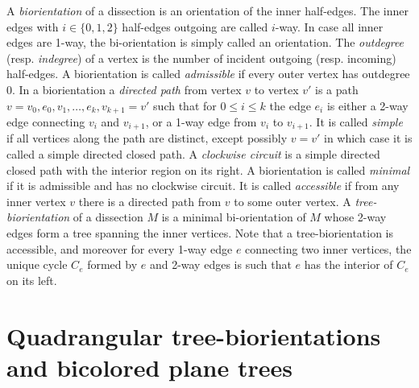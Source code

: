 \documentclass[letter]{amsart}
\numberwithin{theo}{section}
\theoremstyle{remark}
\begin{document}
A \emph{biorientation} of a dissection is an orientation of the inner half-edges. The inner edges with $i\in\{0,1,2\}$ half-edges outgoing are called $i$-way. In case all inner edges are 1-way, the bi-orientation is simply called an orientation. The \emph{outdegree} (resp. \emph{indegree}) of a vertex is the number of incident outgoing (resp. incoming) half-edges. 
A biorientation is called \emph{admissible} if every outer vertex has outdegree $0$. In a biorientation a \emph{directed path} from vertex $v$ to vertex $v'$ is a path $v=v_0,e_0,v_1,\ldots,e_k,v_{k+1}=v'$ such that for $0\leq i\leq k$ the edge $e_i$ is either a 2-way edge connecting $v_i$ and $v_{i+1}$, or a 1-way edge from $v_i$ to $v_{i+1}$. It is called \emph{simple} if all vertices along the path are distinct, except possibly $v=v'$ in which case it is called a simple directed closed path.    
 A \emph{clockwise circuit} is a simple directed closed path with the interior region on its right. A biorientation is called \emph{minimal} if it is admissible and has no clockwise circuit. 
 It is called \emph{accessible} if from any inner vertex $v$ there is a directed path from $v$ to some outer vertex.  
 A \emph{tree-biorientation} of a dissection $M$ is a minimal bi-orientation of $M$ whose 2-way edges form a tree spanning the inner vertices. Note that a tree-biorientation is accessible, and moreover for every 1-way edge $e$ connecting two inner vertices, the unique cycle $C_e$ formed by $e$ and 2-way edges is such that $e$ has the interior of $C_e$ on its left. 




\section{Quadrangular tree-biorientations and bicolored plane trees}
\end{document}
